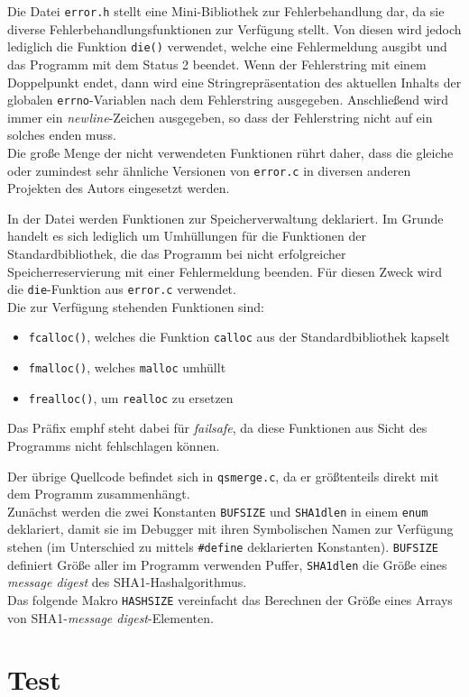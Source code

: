 \documentclass[a4paper,titlepage,12pt]{scrartcl}
\begin{document}
Die Datei \texttt{error.h} stellt eine Mini-Bibliothek zur Fehlerbehandlung dar,
da sie diverse Fehlerbehandlungsfunktionen zur Verfügung stellt.
Von diesen wird jedoch lediglich die Funktion \texttt{die()} verwendet,
welche eine Fehlermeldung ausgibt und das Programm mit dem Status 2 beendet.
Wenn der Fehlerstring mit einem Doppelpunkt endet,
dann wird eine Stringrepräsentation des aktuellen Inhalts der globalen \texttt{errno}-Variablen nach dem Fehlerstring ausgegeben.
Anschließend wird immer ein \emph{newline}-Zeichen ausgegeben,
so dass der Fehlerstring nicht auf ein solches enden muss.
\\
Die große Menge der nicht verwendeten Funktionen rührt daher,
dass die gleiche oder zumindest sehr ähnliche Versionen von \texttt{error.c} in diversen anderen Projekten des Autors eingesetzt werden.

In der Datei werden Funktionen zur Speicherverwaltung deklariert.
Im Grunde handelt es sich lediglich um Umhüllungen für die Funktionen der Standardbibliothek,
die das Programm bei nicht erfolgreicher Speicherreservierung mit einer Fehlermeldung beenden.
Für diesen Zweck wird die \texttt{die}-Funktion aus \texttt{error.c} verwendet.
\\
Die zur Verfügung stehenden Funktionen sind:
\begin{itemize}
\item \texttt{fcalloc()}, welches die Funktion \texttt{calloc} aus der Standardbibliothek kapselt
\item \texttt{fmalloc()}, welches \texttt{malloc} umhüllt
\item \texttt{frealloc()}, um \texttt{realloc} zu ersetzen
\end{itemize}
Das Präfix emph{f} steht dabei für \emph{failsafe},
da diese Funktionen aus Sicht des Programms nicht fehlschlagen können.

Der übrige Quellcode befindet sich in \texttt{qsmerge.c},
da er größtenteils direkt mit dem Programm zusammenhängt.
\\
Zunächst werden die zwei Konstanten \texttt{BUFSIZE} und \texttt{SHA1dlen} in einem \texttt{enum} deklariert,
damit sie im Debugger mit ihren Symbolischen Namen zur Verfügung stehen
(im Unterschied zu mittels \texttt{\#define} deklarierten Konstanten).
\texttt{BUFSIZE} definiert Größe aller im Programm verwenden Puffer,
\texttt{SHA1dlen} die Größe eines \emph{message digest} des SHA1-Hashalgorithmus.
\\
Das folgende Makro \texttt{HASHSIZE} vereinfacht das Berechnen der Größe eines Arrays von SHA1-\emph{message digest}-Elementen.

\section{Test}
\label{sec:test}



\end{document}
